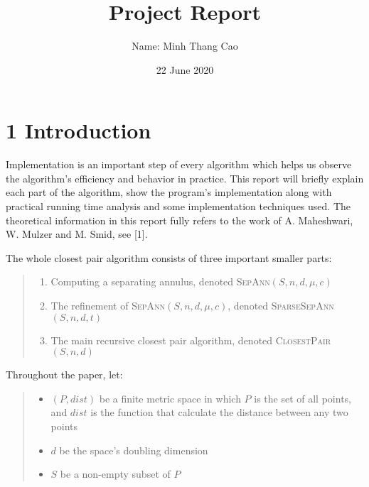 \documentclass[12pt,english,]{article}
\title{\Huge\textbf{Project Report}}
\subtitle{Name: Minh Thang Cao}
\author{}
\date{\vspace{-2.5em}22 June 2020}
\providecommand{\tightlist}{%
  \setlength{\itemsep}{0pt}\setlength{\parskip}{0pt}}
\begin{document}
\maketitle


\hypertarget{introduction}{%
\section{\texorpdfstring{1
\enspace Introduction}{1 Introduction}}\label{introduction}}

Implementation is an important step of every algorithm which helps us
observe the algorithm's efficiency and behavior in practice. This report
will briefly explain each part of the algorithm, show the program's
implementation along with practical running time analysis and some
implementation techniques used. The theoretical information in this
report fully refers to the work of A. Maheshwari, W. Mulzer and M. Smid,
see {[}1{]}.

The whole closest pair algorithm consists of three important smaller
parts:

\vspace{-3.5truemm}

\begin{quote}
\begin{enumerate}
\item Computing a separating annulus, denoted \textsc{SepAnn}$(S,n,d,\mu,c)$
\item The refinement of \textsc{SepAnn}$(S,n,d,\mu,c)$, denoted \textsc{SparseSepAnn}$(S,n,d,t)$
\item The main recursive closest pair algorithm, denoted \textsc{ClosestPair}$(S,n,d)$
\end{enumerate}
\end{quote}

\vspace{-3.5truemm}

Throughout the paper, let:

\vspace{-2truemm}

\begin{quote}
\begin{itemize}
\tightlist
\item
  \((P, dist)\) be a finite metric space in which \(P\) is the set of
  all points, and \(dist\) is the function that calculate the distance
  between any two points
\item
  \(d\) be the space's doubling dimension
\item
  \(S\) be a non-empty subset of \(P\)
\end{itemize}
\end{quote}
\end{document}
